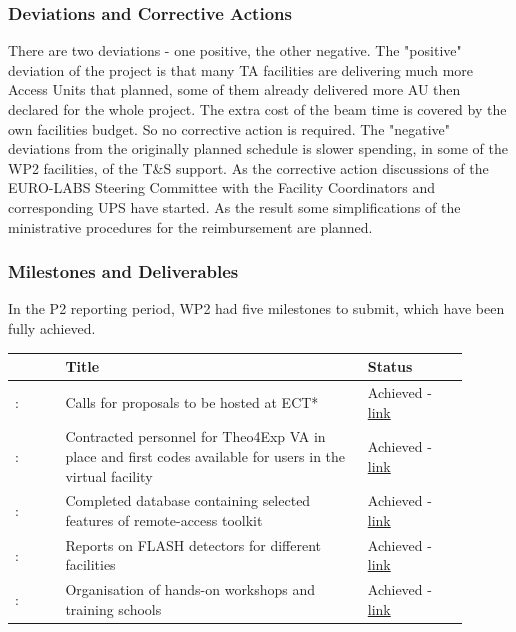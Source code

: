 \subsubsection*{Deviations and Corrective Actions}
\label{sec:wp2-deviations}
There are two deviations - one positive, the other negative. The "positive" deviation of the project is that many TA facilities are delivering much more Access Units that planned, some of them already delivered more AU then declared for the whole project. The extra cost of the beam time is covered by the own facilities budget. So no corrective action is required.
The "negative" deviations from the originally planned schedule is slower spending, in some of the WP2 facilities, of the T\&S support. As the corrective action discussions of the EURO-LABS Steering Committee with the Facility Coordinators and corresponding UPS have started. As the result some simplifications of the ministrative procedures for the reimbursement are planned.  


\subsubsection*{Milestones and Deliverables}
In the P2 reporting period, WP2 had five milestones to submit, which have been fully achieved.
{\fontsize{9}{11}\selectfont
\begin{center}
  \begin{tabular}[t]{!{\color{mygray}\vrule}p{0.10\linewidth}!
  {\color{mygray}\vrule}p{0.60\linewidth}!
  {\color{mygray}\vrule}p{0.20\linewidth}!{\color{mygray}\vrule} } \hline
     & {\bf Title} & {\bf Status} \\ \hline
    : &Calls for proposals to be hosted at ECT*&  Achieved - \href{https://web.infn.it/EURO-LABS/wp-content/uploads/2024/05/EURO-LABS_MS8-Final-1.pdf} {link}  \\ \hline
    : & Contracted personnel for Theo4Exp VA in place and first codes available for users in the virtual facility & Achieved - \href{https://web.infn.it/EURO-LABS/wp-content/uploads/2024/05/EURO-LABS_MS10_The4Exp_02_2024_FINAL-1.pdf}{link} \\ \hline    
    : & Completed database containing selected features of remote-access toolkit & Achieved - \href{https://web.infn.it/EURO-LABS/wp-content/uploads/2024/05/EURO-LABS_MS12-Report-RemoteAccess_Final.pdf}{link} \\ \hline 
    : & Reports on FLASH detectors for different facilities & Achieved - \href{https://web.infn.it/EURO-LABS/wp-content/uploads/2024/05/EURO-LABS_MS14_Report.pdf}{link} \\ \hline 
    : & 	Organisation of hands-on workshops and training schools & Achieved - \href{https://zenodo.org/records/15039933}{link} \\ \hline 
  \end{tabular}
\end{center}
}


